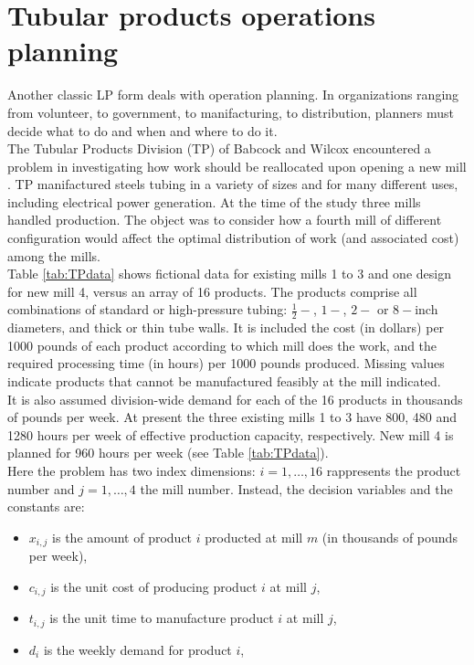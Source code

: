 \documentclass[a4paper,10 pt,titlepage,twoside]{book}
\theoremstyle{plain}
\theoremstyle{definition}
\theoremstyle{remark}
\begin{document}
{{\section{Tubular products operations planning}
Another classic LP form deals with operation planning. In organizations ranging from volunteer, to government, to manifacturing, to distribution, planners must decide what to do and when and where to do it.\\
The Tubular Products Division (TP) of Babcock and Wilcox encountered a problem in investigating how work should be reallocated upon opening a new mill \cite{FEM}. TP manifactured steels tubing in a variety of sizes and for many different uses, including electrical power generation. At the time of the study three mills handled production. The object was to consider how a fourth mill of different configuration would affect the optimal distribution of work (and associated cost) among the mills.\\Table \ref{tab:TPdata} shows fictional data for existing mills 1 to 3 and one design for new mill 4, versus an array of 16 products. The products comprise all combinations of standard or high-pressure tubing: $\frac{1}{2}-$, $1-$, $2-$ or $8-$inch diameters, and thick or thin tube walls. It is included the cost (in dollars) per 1000 pounds of each product according to which mill does the work, and the required processing time (in hours) per 1000 pounds produced. Missing values indicate products that cannot be manufactured feasibly at the mill indicated.\\
It is also assumed division-wide demand for each of the 16 products in thousands of pounds per week. At present the three existing mills 1 to 3 have 800, 480 and 1280 hours per week of effective production capacity, respectively. New mill 4 is planned for 960 hours per week (see Table \ref{tab:TPdata}).\\
Here the problem has two index dimensions: $i= 1, \dots, 16$ rappresents the product number and $j=1, \dots, 4$ the mill number. Instead, the decision variables and the constants are:
\begin{itemize}
	\item $x_{i,j}$ is the amount of product $i$ producted at mill $m$ (in thousands of pounds per week),
	\item $c_{i,j}$ is the unit cost of producing product $i$ at mill $j$,
	\item $t_{i,j}$ is the unit time to manufacture product $i$ at mill $j$,
	\item $d_{i}$ is the weekly demand for product $i$,

\end{itemize}}}
\end{document}
